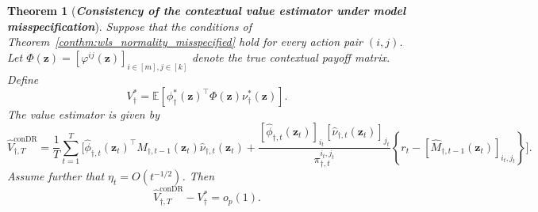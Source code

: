 \documentclass[12pt]{article}
\newtheorem{theorem}{Theorem}
\newtheorem{remark}{Remark}
\begin{document}
\begin{theorem}[\textbf{\emph{Consistency of the contextual value estimator under model misspecification}}]
\label{conthm:value_rootT_misspecified}
Suppose that the conditions of Theorem~\ref{conthm:wls_normality_misspecified} hold for every action pair
$(i,j)$. Let $\Phi(\bm z)=\left[\varphi^{ij}(\bm z)\right]_{i\in[m],j\in[k]}$
denote the true contextual payoff matrix. Define $$V_\dagger^\ast
= \mathbb E
\left[
\phi_\dagger^\ast(\bm z)^\top
\Phi(\bm z)
\nu_\dagger^\ast(\bm z)
\right].$$
The value estimator is given by
\[
\widehat V_{\dagger,T}^{\mathrm{conDR}}
=
\frac{1}{T} \sum_{t=1}^T \Bigg[ \widehat{\phi}_{\dagger,t}(\bm z_t)^\top \widehat M_{\dagger,t-1}(\bm z_t) \widehat{\nu}_{\dagger,t}(\bm z_t) + \frac{ [\widehat{\phi}_{\dagger,t}(\bm z_t)]_{i_t} [\widehat{\nu}_{\dagger,t}(\bm z_t)]_{j_t} }{ \pi_{\dagger,t}^{i_t,j_t} } \left\{ r_t-[\widehat M_{\dagger,t-1}(\bm z_t)]_{i_t,j_t} \right\} \Bigg].
\]
Assume further that $\eta_t=O(t^{-1/2})$. Then
\[
\widehat V_{\dagger,T}^{\mathrm{conDR}}
- V_\dagger^\ast = o_p(1).
\]
\end{theorem}
\end{document}

